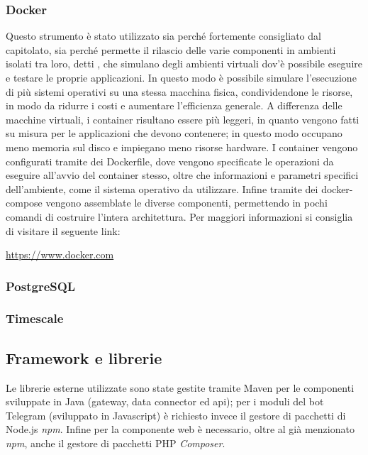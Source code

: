 		\subsubsection{Docker}
			Questo strumento è stato utilizzato sia perché fortemente consigliato dal capitolato, sia perché permette il rilascio delle varie componenti in ambienti isolati tra loro, detti , che simulano degli ambienti virtuali dov'è possibile eseguire e testare le proprie applicazioni.
			\newline
			In questo modo è possibile simulare l'esecuzione di più sistemi operativi su una stessa macchina fisica, condividendone le risorse, in modo da ridurre i costi e aumentare l'efficienza generale.
			\newline
			A differenza delle macchine virtuali, i container risultano essere più leggeri, in quanto vengono fatti su misura per le applicazioni che devono contenere; in questo modo occupano meno memoria sul disco e impiegano meno risorse hardware.
			\newline
			I container vengono configurati tramite dei Dockerfile, dove vengono specificate le operazioni da eseguire all'avvio del container stesso, oltre che informazioni e parametri specifici dell'ambiente, come il sistema operativo  da utilizzare. Infine tramite dei docker-compose vengono assemblate le diverse componenti, permettendo in pochi comandi di costruire l'intera architettura.
			\newline
			Per maggiori informazioni si consiglia di visitare il seguente link:
			\newline
			\begin{center}
				\url{https://www.docker.com}
			\end{center}
		\subsubsection{PostgreSQL}
		\subsubsection{Timescale}
	\subsection{Framework e librerie}
		Le librerie esterne utilizzate sono state gestite tramite Maven per le componenti sviluppate in Java (gateway, data connector ed api); per i moduli del bot Telegram (sviluppato in Javascript) è richiesto invece il gestore di pacchetti di Node.js \textit{npm}. Infine per la componente web è necessario, oltre al già menzionato \textit{npm}, anche il gestore di pacchetti PHP \textit{Composer}.
